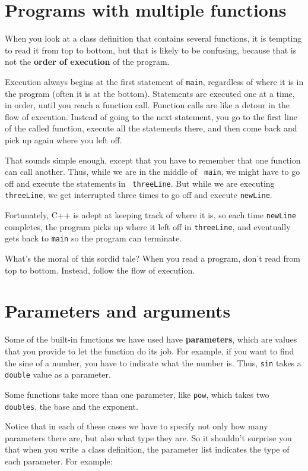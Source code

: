\section {Programs with multiple functions}

When you look at a class definition that contains several functions, it
is tempting to read it from top to bottom, but that is likely to be
confusing, because that is not the {\bf order of execution} of the
program.

Execution always begins at the first statement of {\tt main},
regardless of where it is in the program (often it is at the bottom).
Statements are executed one at a time, in order, until you reach a
function call.  Function calls are like a detour in the flow of
execution.  Instead of going to the next statement, you go to the
first line of the called function, execute all the statements there,
and then come back and pick up again where you left off.

That sounds simple enough, except that you have to remember that one
function can call another.  Thus, while we are in the middle of {\tt
main}, we might have to go off and execute the statements in {\tt
threeLine}.  But while we are executing {\tt threeLine}, we get
interrupted three times to go off and execute {\tt newLine}.

Fortunately, C++ is adept at keeping track of where it is, so
each time {\tt newLine} completes, the program picks up where it left
off in {\tt threeLine}, and eventually gets back to {\tt main} so the
program can terminate.

What's the moral of this sordid tale?  When you read a program, don't
read from top to bottom.  Instead, follow the flow of execution.

\section {Parameters and arguments}

Some of the built-in functions we have used have {\bf parameters},
which are values that you provide to let the function do its
job.  For example, if you want to find the sine of a number,
you have to indicate what the number is.  Thus, {\tt sin}
takes a {\tt double} value as a parameter.

Some functions take more than one parameter, like {\tt pow},
which takes two {\tt doubles}, the base and the exponent.

Notice that in each of these cases we have to specify not
only how many parameters there are, but also what type they
are.  So it shouldn't surprise you that when you write a
class definition, the parameter list indicates the type of
each parameter.  For example:

